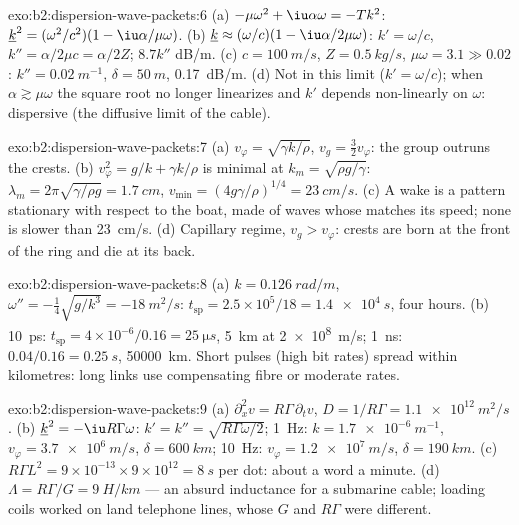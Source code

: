 \begin{solution}{exo:b2:dispersion-wave-packets:6}
(a) $-\mu\omega^2 + \iu\alpha\omega = -Tk^2$: $\underline k^2 = (\omega^2/c^2)(1 - \iu\alpha/\mu\omega)$.
(b) $\underline k \approx (\omega/c)(1 - \iu\alpha/2\mu\omega)$: $k' = \omega/c$, $k'' = \alpha/2\mu c =
\alpha/2Z$; $8.7k''$ dB/m. (c) $c = \qty{100}{m/s}$, $Z = \qty{0.5}{kg/s}$, $\mu\omega = 3.1 \gg
0.02$: $k'' = \qty{0.02}{m^{-1}}$, $\delta = \qty{50}{m}$, \qty{0.17}{dB/m}. (d) Not in this
limit ($k' = \omega/c$); when $\alpha \gtrsim \mu\omega$ the square root no longer
linearizes and $k'$ depends non-linearly on $\omega$: dispersive (the
diffusive limit of the cable).
\end{solution}

\begin{solution}{exo:b2:dispersion-wave-packets:7}
(a) $v_\varphi = \sqrt{\gamma k/\rho}$, $v_g = \tfrac32v_\varphi$: the group outruns the
crests. (b) $v_\varphi^2 = g/k + \gamma k/\rho$ is minimal at $k_m = \sqrt{\rho g/\gamma}$:
$\lambda_m = 2\pi\sqrt{\gamma/\rho g} = \qty{1.7}{cm}$, $v_{\min} = (4g\gamma/\rho)^{1/4} =
\qty{23}{cm/s}$. (c) A wake is a pattern stationary with respect to the
boat, made of waves whose  matches its speed; none is
slower than \qty{23}{cm/s}. (d) Capillary regime, $v_g > v_\varphi$: crests are
born at the front of the ring and die at its back.
\end{solution}

\begin{solution}{exo:b2:dispersion-wave-packets:8}
(a) $k = \qty{0.126}{rad/m}$, $\omega'' = -\tfrac14\sqrt{g/k^3} = \qty{-18}{m^2/s}$: $t_{\text{sp}}
= 2.5 \times 10^5/18 = \qty{1.4e4}{s}$, four hours. (b) \qty{10}{ps}: $t_{\text{sp}} =
4 \times 10^{-6}/0.16 = \qty{25}{\micro s}$, \qty{5}{km} at \qty{2e8}{m/s}; \qty{1}{ns}: $0.04/0.16 =
\qty{0.25}{s}$, \qty{50000}{km}. Short pulses (high bit rates) spread within
kilometres: long links use compensating fibre or moderate rates.
\end{solution}

\begin{solution}{exo:b2:dispersion-wave-packets:9}
(a) $\partial_x^2v = R\Gamma\,\partial_tv$, $D = 1/R\Gamma = \qty{1.1e12}{m^2/s}$. (b) $\underline k^2
= -\iu R\Gamma\omega$: $k' = k'' = \sqrt{R\Gamma\omega/2}$; \qty{1}{Hz}: $k = \qty{1.7e-6}{m^{-1}}$,
$v_\varphi = \qty{3.7e6}{m/s}$, $\delta = \qty{600}{km}$; \qty{10}{Hz}: $v_\varphi = \qty{1.2e7}{m/s}$,
$\delta = \qty{190}{km}$. (c) $R\Gamma L^2 = 9 \times 10^{-13} \times 9 \times 10^{12} = \qty{8}{s}$
per dot: about a word a minute. (d) $\Lambda = R\Gamma/G = \qty{9}{H/km}$ --- an
absurd inductance for a submarine cable; loading coils worked on land
telephone lines, whose $G$ and $R\Gamma$ were different.
\end{solution}

